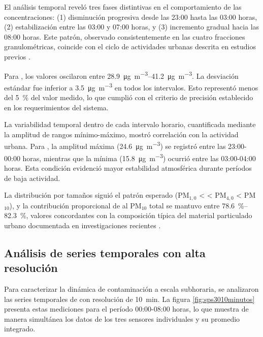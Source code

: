 El análisis temporal reveló tres fases distintivas en el comportamiento de las concentraciones: (1) disminución progresiva desde las 23:00 hasta las 03:00 horas, (2) estabilización entre las 03:00 y 07:00 horas, y (3) incremento gradual hacia las 08:00 horas. Este patrón, observado consistentemente en las cuatro fracciones granulométricas, coincide con el ciclo de actividades urbanas descrita en estudios previos \citep{Nasar2024}.

Para \MPF, los valores oscilaron entre \mbox{\SIrange{28,9}{41,2}{\micro\gram\per\cubic\meter}}. La desviación estándar fue inferior a \mbox{\SI{3,5}{\micro\gram\per\cubic\meter}} en todos los intervalos. 
Esto representó menos del \mbox{\SI{5}{\percent}} del valor medido, lo que cumplió 
con el criterio de precisión establecido en los requerimientos del sistema.

La variabilidad temporal dentro de cada intervalo horario, cuantificada mediante la amplitud de rangos mínimo-máximo, mostró correlación con la actividad urbana. Para \MPF, la amplitud máxima (\SI{24.6}{\micro\gram\per\cubic\meter}) se registró entre las 23:00-00:00 horas, mientras que la mínima (\SI{15.8}{\micro\gram\per\cubic\meter}) ocurrió entre las 03:00-04:00 horas. Esta condición evidenció mayor estabilidad atmosférica durante períodos de baja actividad.

La distribución por tamaños siguió el patrón esperado (PM$_{1,0}$ < \MPF < PM$_{4,0}$ < PM$_{10}$), y la contribución proporcional de \MPF al PM$_{10}$ total se mantuvo entre \SIrange{78.6}{82.3}{\percent}, valores concordantes con la composición típica del material particulado urbano documentada en investigaciones recientes \citep{Jordi2022}.

\newpage
\subsection{Análisis de series temporales con alta resolución}

Para caracterizar la dinámica de contaminación a escala subhoraria, se analizaron las series temporales de \MPF con resolución de \SI{10}{\minute}. La figura \ref{fig:sps3010minutos} presenta estas mediciones para el período 00:00-08:00 horas, lo que muestra de manera simultánea los datos de los tres sensores individuales y su promedio integrado.



